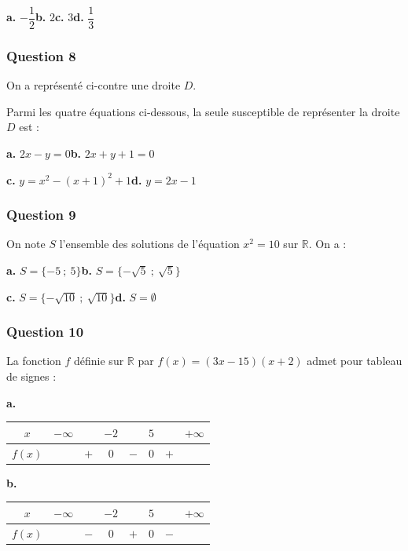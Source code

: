 \documentclass[10pt]{article}
\providecommand{\R}{\mathbb{R}}
\begin{document}
\textbf{a.} $-\dfrac{1}{2}$\hfill \textbf{b.} $2$\hfill \textbf{c.} $3$\hfill \textbf{d.} $\dfrac{1}{3}$

\bigskip

\begin{minipage}[t]{0.8\textwidth}
\subsubsection*{Question 8}
On a représenté ci-contre une droite $D$.

Parmi les quatre équations ci-dessous, la seule susceptible de représenter la droite $D$ est :

\textbf{a.} $2x - y = 0$\hfill \textbf{b.} $2x + y + 1 = 0$

\textbf{c.} $y = x^2 - (x + 1)^2 + 1$\hfill \textbf{d.} $y = 2x - 1$
\end{minipage}
\hfill
\begin{minipage}[t]{0.15\textwidth}
\vspace{0pt}
\end{minipage}

\subsubsection*{Question 9}
On note $S$ l'ensemble des solutions de l'équation $x^2 = 10$ sur $\R$. On a :

\textbf{a.} $S = \{-5~;~5\}$\hfill \textbf{b.} $S = \{-\sqrt{5}~;~\sqrt{5}\}$

\textbf{c.} $S = \{-\sqrt{10}~;~\sqrt{10}\}$\hfill \textbf{d.} $S = \emptyset$

\subsubsection*{Question 10}
La fonction $f$ définie sur $\R$ par $f(x) = (3x - 15)(x + 2)$ admet pour tableau de signes :

\textbf{a.} 
\begin{tabular}{|c|ccccccc|}
\hline
$x$ & $-\infty$ & & $-2$ & & $5$ & & $+\infty$ \\
\hline
$f(x)$ & & $+$ & $0$ & $-$ & $0$ & $+$ &\\
\hline
\end{tabular}
\hfill 
\textbf{b.} 
\begin{tabular}{|c|ccccccc|}
\hline
$x$ & $-\infty$ & & $-2$ & & $5$ & & $+\infty$ \\
\hline
$f(x)$ & & $-$ & $0$ & $+$ & $0$ & $-$ &\\
\hline
\end{tabular}
\end{document}
